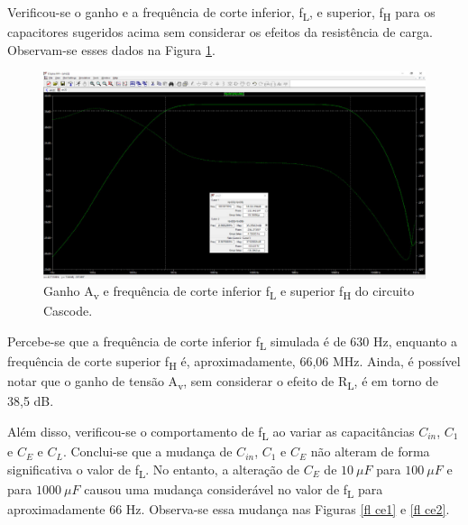 \documentclass[journal, a4paper]{IEEEtran}
\newcommand\tab[1][1cm]{\hspace*{#1}}
\begin{document}
      
    	   
        \tab Verificou-se o ganho e a frequência de corte inferior, f\textsubscript{L}, e superior, f\textsubscript{H} para os capacitores sugeridos acima sem considerar os efeitos da resistência de carga. Observam-se esses dados na Figura \ref{Ganho1}.
        
            \begin{figure}[H]
        		\begin{center}
        		\includegraphics[width=\columnwidth]{Ganho.jpeg}
        		\caption{Ganho A\textsubscript{v} e frequência de corte inferior f\textsubscript{L} e superior f\textsubscript{H} do circuito Cascode.}
        		\label{Ganho1}
        		\end{center}
    	    \end{figure}
    	 
        \tab Percebe-se que a frequência de corte inferior f\textsubscript{L} simulada é de 630 Hz, enquanto a frequência de corte superior f\textsubscript{H} é, aproximadamente, 66,06 MHz. Ainda, é possível notar que o ganho de tensão A\textsubscript{v}, sem considerar o efeito de R\textsubscript{L}, é em torno de 38,5 dB.
        
        \tab Além disso, verificou-se o comportamento de f\textsubscript{L} ao variar as capacitâncias $C_{in}$, $C_1$ e $C_E$ e $C_L$. Conclui-se que a mudança de $C_{in}$, $C_1$ e $C_E$ não alteram de forma significativa o valor de f\textsubscript{L}. No entanto, a alteração de $C_E$ de $10 \: \mu F$ para $100 \: \mu F$ e para $1000 \: \mu F$ causou uma mudança considerável no valor de f\textsubscript{L} para aproximadamente 66 Hz. Observa-se essa mudança nas Figuras \ref{fl ce1} e \ref{fl ce2}.
            
\end{document}
